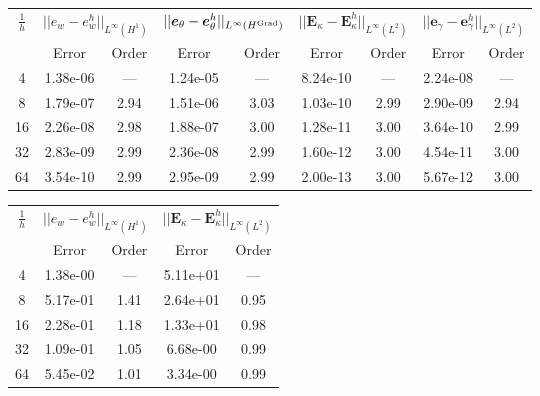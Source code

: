 \begin{table}[hp]
	\centering
	\begin{tabular}{ccccccccc}
		\hline 
		\multirow{2}{*}{$\frac{1}{h}$} & \multicolumn{2}{c}{$||e_w - e_w^h||_{L^{\infty}(H^1)}$}    & \multicolumn{2}{c}{$||\bm{e}_\theta - \bm{e}_\theta^h||_{L^{\infty}(H^{\operatorname*{Grad}})}$} & \multicolumn{2}{c}{$||\bm{E}_\kappa - \bm{E}_\kappa^h||_{L^{\infty}(L^2)}$} & \multicolumn{2}{c}{$||\bm{e}_\gamma - \bm{e}_\gamma^ h||_{L^{\infty}(L^2)}$}   \\
		& Error & Order  & Error & Order  & Error & Order  & Error & Order   \\ 
		\hline 
		4  & 1.38e-06 & ---  & 1.24e-05 & ---  & 8.24e-10 & ---  & 2.24e-08 & --- \\ 
		8  & 1.79e-07 & 2.94 & 1.51e-06 & 3.03 & 1.03e-10 & 2.99 & 2.90e-09 & 2.94\\ 
		16 & 2.26e-08 & 2.98 & 1.88e-07 & 3.00 & 1.28e-11 & 3.00 & 3.64e-10 & 2.99\\ 
		32 & 2.83e-09 & 2.99 & 2.36e-08 & 2.99 & 1.60e-12 & 3.00 & 4.54e-11 & 3.00\\ 
		64 & 3.54e-10 & 2.99 & 2.95e-09 & 2.99 & 2.00e-13 & 3.00 & 5.67e-12 & 3.00\\ 
		\hline 
	\end{tabular} 
	\captionsetup{width=0.95\linewidth}
	\vspace{1mm}
	\label{tab:resminCGDG_k3}
\end{table}


\begin{table}[hp]
	\centering
	\begin{tabular}{ccccc}
		\hline 
		\multirow{2}{*}{$\frac{1}{h}$} & \multicolumn{2}{c}{$||e_w - e_w^h||_{L^{\infty}(H^1)}$}  & \multicolumn{2}{c}{$||\bm{E}_\kappa - \bm{E}_\kappa^h||_{L^{\infty}(L^2)}$}   \\ 
		& Error & Order  & Error & Order  \\
		\hline 
		4  & 1.38e-00 & ---  & 5.11e+01 & ---  \\ 
		8  & 5.17e-01 & 1.41 & 2.64e+01 & 0.95 \\ 
		16 & 2.28e-01 & 1.18 & 1.33e+01 & 0.98 \\ 
		32 & 1.09e-01 & 1.05 & 6.68e-00 & 0.99 \\ 
		64 & 5.45e-02 & 1.01 & 3.34e-00 & 0.99 \\ 
		\hline 
	\end{tabular} 
	\captionsetup{width=0.95\linewidth}
	\vspace{1mm}
	\label{tab:reskirHHJ_SSSS_k1}
\end{table}

